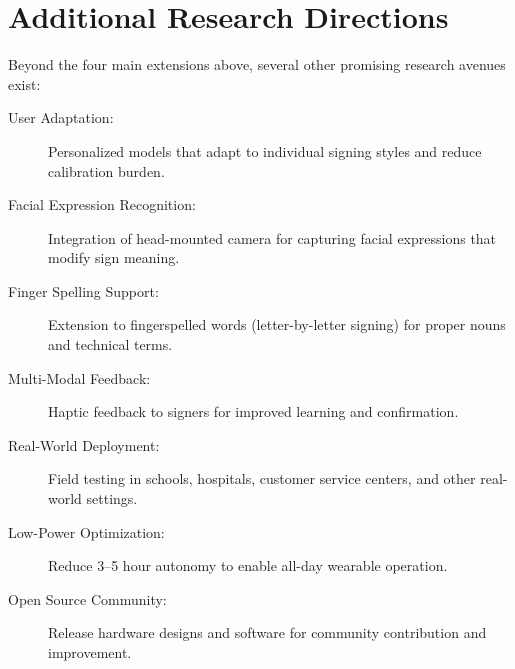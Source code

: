 \documentclass[12pt,a4paper]{report}
\begin{document}
\section{Additional Research Directions}
\label{sec:future_additional}

Beyond the four main extensions above, several other promising research avenues exist:

\begin{description}
  \item[User Adaptation:] Personalized models that adapt to individual signing styles and reduce calibration burden.
  \item[Facial Expression Recognition:] Integration of head-mounted camera for capturing facial expressions that modify sign meaning.
  \item[Finger Spelling Support:] Extension to fingerspelled words (letter-by-letter signing) for proper nouns and technical terms.
  \item[Multi-Modal Feedback:] Haptic feedback to signers for improved learning and confirmation.
  \item[Real-World Deployment:] Field testing in schools, hospitals, customer service centers, and other real-world settings.
  \item[Low-Power Optimization:] Reduce 3--5 hour autonomy to enable all-day wearable operation.
  \item[Open Source Community:] Release hardware designs and software for community contribution and improvement.
\end{description}

\end{document}

